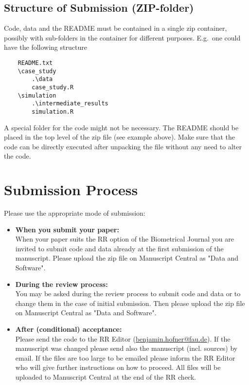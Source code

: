 \documentclass[12pt,a4paper]{article}
\begin{document}
\subsection{Structure of Submission (ZIP-folder)}\label{sec:structure}

Code, data and the README {must} be contained in a single zip container,
possibly with sub-folders in the container for different purposes. E.g.\ one
could have the following structure

\begin{verbatim}
    README.txt
    \case_study
        .\data
        case_study.R
    \simulation
        .\intermediate_results
        simulation.R
\end{verbatim}

A special folder for the code might not be necessary. The README should be
placed in the top level of the zip file (see example above). Make sure that the
code can be directly executed after unpacking the file without any need to alter
the code.

\section{Submission Process}

Please use the appropriate mode of submission:

\begin{itemize}
\item \textbf{When you submit your paper:}\\[0.5em]
  When your paper suits the RR option of the Biometrical Journal you are
  invited to submit code and data already at the first submission of the
  manuscript. Please upload the zip file on Manuscript Central as "Data and
  Software".
\item \textbf{During the review process:}\\[0.5em]
  You may be asked during the review process to submit code and data or to
  change them in the case of initial submission. Then please upload the zip file
  on Manuscript Central as "Data and Software".
\item \textbf{After (conditional) acceptance:}\\[0.5em]
  Please send the code to the RR Editor
  (\href{mailto:benjamin.hofner@fau.de}{benjamin.hofner@fau.de}). If the
  manuscript was changed please send also the manuscript (incl. sources) by
  email. If the files are too large to be emailed please inform the RR Editor
  who will give further instructions on how to proceed. All files will be
  uploaded to Manuscript Central at the end of the RR check.
\end{itemize}
\end{document}
